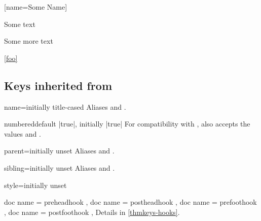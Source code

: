 \documentclass{ltxdoc}
\begin{document}
\begin{tcbwritetemp}
[name=Some Name]
\end{tcbwritetemp}

\begin{thmkeyscode}[preamble]
\begin{mytheorem}[a note]
Some text
\end{mytheorem}

\begin{mytheorem}[name=heading,label=foo]
Some more text
\end{mytheorem}

\ref{foo}
\end{thmkeyscode}

\subsection{Keys inherited from }

\begin{docKey}[][doc label=thm/name]{name}{=}{initially title-cased }
Aliases  and .
\end{docKey}

\begin{docKey}{numbered}{}{default |true|, initially |true|}
For compatibility with , also accepts the values  and .
\end{docKey}

\begin{docKey}{parent}{=}{initially unset}
Aliases  and .
\end{docKey}

\begin{docKey}{sibling}{=}{initially unset}
Aliases  and .
\end{docKey}

\begin{docKey}{style}{=}{initially unset}

\end{docKey}

\begin{docKeys}[
  doc parameter = {=\meta{code}},
  doc description = initially unset,
  ]
  {
	{ doc name = preheadhook },
	{ doc name = postheadhook },
	{ doc name = prefoothook },
	{ doc name = postfoothook },
  }
Details in \autoref{thmkeys-hooks}.
\end{docKeys}
\end{document}
